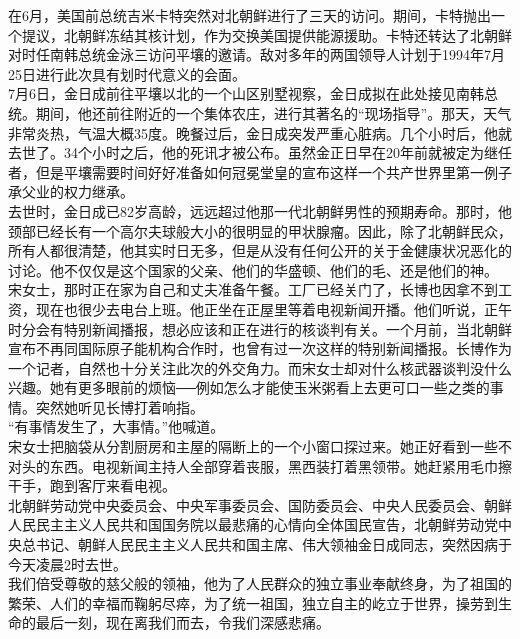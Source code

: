 在6月，美国前总统吉米卡特突然对北朝鲜进行了三天的访问。期间，卡特抛出一个提议，北朝鲜冻结其核计划，作为交换美国提供能源援助。卡特还转达了北朝鲜对时任南韩总统金泳三访问平壤的邀请。敌对多年的两国领导人计划于1994年7月25日进行此次具有划时代意义的会面。\\

7月6日，金日成前往平壤以北的一个山区别墅视察，金日成拟在此处接见南韩总统。期间，他还前往附近的一个集体农庄，进行其著名的“现场指导”。那天，天气非常炎热，气温大概35度。晚餐过后，金日成突发严重心脏病。几个小时后，他就去世了。34个小时之后，他的死讯才被公布。虽然金正日早在20年前就被定为继任者，但是平壤需要时间好好准备如何冠冕堂皇的宣布这样一个共产世界里第一例子承父业的权力继承。\\

去世时，金日成已82岁高龄，远远超过他那一代北朝鲜男性的预期寿命。那时，他颈部已经长有一个高尔夫球般大小的很明显的甲状腺瘤。因此，除了北朝鲜民众，所有人都很清楚，他其实时日无多，但是从没有任何公开的关于金健康状况恶化的讨论。他不仅仅是这个国家的父亲、他们的华盛顿、他们的毛、还是他们的神。\\

宋女士，那时正在家为自己和丈夫准备午餐。工厂已经关门了，长博也因拿不到工资，现在也很少去电台上班。他正坐在正屋里等着电视新闻开播。他们听说，正午时分会有特别新闻播报，想必应该和正在进行的核谈判有关。一个月前，当北朝鲜宣布不再同国际原子能机构合作时，也曾有过一次这样的特别新闻播报。长博作为一个记者，自然也十分关注此次的外交角力。而宋女士却对什么核武器谈判没什么兴趣。她有更多眼前的烦恼──例如怎么才能使玉米粥看上去更可口一些之类的事情。突然她听见长博打着响指。\\

“有事情发生了，大事情。”他喊道。\\

宋女士把脑袋从分割厨房和主屋的隔断上的一个小窗口探过来。她正好看到一些不对头的东西。电视新闻主持人全部穿着丧服，黑西装打着黑领带。她赶紧用毛巾擦干手，跑到客厅来看电视。\\

北朝鲜劳动党中央委员会、中央军事委员会、国防委员会、中央人民委员会、朝鲜人民民主主义人民共和国国务院以最悲痛的心情向全体国民宣告，北朝鲜劳动党中央总书记、朝鲜人民民主主义人民共和国主席、伟大领袖金日成同志，突然因病于今天凌晨2时去世。\\

我们倍受尊敬的慈父般的领袖，他为了人民群众的独立事业奉献终身，为了祖国的繁荣、人们的幸福而鞠躬尽瘁，为了统一祖国，独立自主的屹立于世界，操劳到生命的最后一刻，现在离我们而去，令我们深感悲痛。\\

